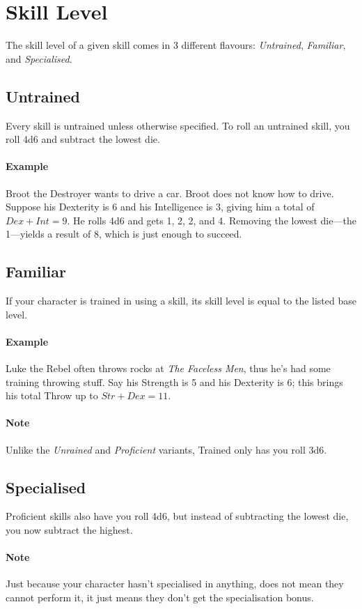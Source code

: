 \section{Skill Level}
The skill level of a given skill comes in 3 different flavours: \textit{Untrained}, \textit{Familiar}, and \textit{Specialised}.

\subsection{Untrained} 
Every skill is untrained unless otherwise specified. 
To roll an untrained skill, you roll 4d6 and subtract the lowest die.

\paragraph{Example} Broot the Destroyer wants to drive a car. Broot does not know how to drive. Suppose his Dexterity is 6 and his Intelligence is 3, giving him a total of $Dex+Int=9$. He rolls 4d6 and gets 1, 2, 2, and 4. Removing the lowest die---the 1---yields a result of 8, which is just enough to succeed.

\subsection{Familiar}
If your character is trained in using a skill, its skill level is equal to the listed base level.

\paragraph{Example} Luke the Rebel often throws rocks at \textit{The Faceless Men}, thus he's had some training throwing stuff. Say his Strength is 5 and his Dexterity is 6; this brings his total Throw up to $Str+Dex=11$.

\paragraph{Note} Unlike the \textit{Unrained} and \textit{Proficient} variants, Trained only has you roll 3d6.

\subsection{Specialised}
Proficient skills also have you roll 4d6, but instead of subtracting the lowest die, you now subtract the highest.
\paragraph{Note} Just because your character hasn't specialised in anything, does not mean they cannot perform it, it just means they don't get the specialisation bonus.

